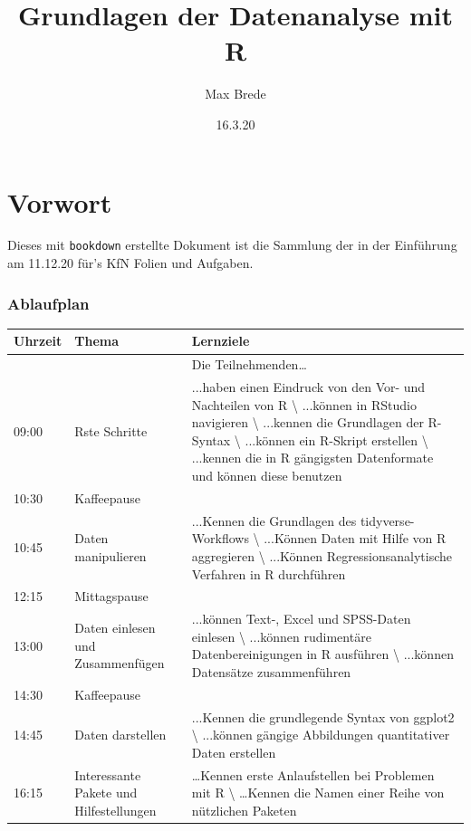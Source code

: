 \documentclass[
]{book}
\title{Grundlagen der Datenanalyse mit R}
\author{Max Brede}
\date{16.3.20}
\begin{document}
\maketitle

{
\setcounter{tocdepth}{1}
\tableofcontents
}
\hypertarget{vorwort}{%
\chapter{Vorwort}\label{vorwort}}

Dieses mit \texttt{bookdown} erstellte Dokument ist die Sammlung der in der Einführung am 11.12.20 für's KfN Folien und Aufgaben.

\hypertarget{ablaufplan}{%
\subsection{Ablaufplan}\label{ablaufplan}}

\begin{tabular}{l|l|l}
\hline
Uhrzeit & Thema & Lernziele\\
\hline
 &  & Die Teilnehmenden…\\
\hline
09:00 & Rste Schritte & ...haben einen Eindruck von den Vor- und Nachteilen von R \textbackslash{}
 ...können in RStudio navigieren \textbackslash{}
 ...kennen die Grundlagen der R-Syntax \textbackslash{}
 ...können ein R-Skript erstellen \textbackslash{}
 ...kennen die in R gängigsten Datenformate und können diese benutzen\\
\hline
10:30 & Kaffeepause & \\
\hline
10:45 & Daten manipulieren & ...Kennen die Grundlagen des tidyverse-Workflows \textbackslash{}
 ...Können Daten mit Hilfe von R aggregieren \textbackslash{}
 ...Können Regressionsanalytische Verfahren in R durchführen\\
\hline
12:15 & Mittagspause & \\
\hline
13:00 & Daten einlesen und Zusammenfügen & ...können Text-, Excel und SPSS-Daten einlesen \textbackslash{}
 ...können rudimentäre Datenbereinigungen in R ausführen \textbackslash{}
 ...können Datensätze zusammenführen\\
\hline
14:30 & Kaffeepause & \\
\hline
14:45 & Daten darstellen & ...Kennen die grundlegende Syntax von ggplot2 \textbackslash{}
 ...können gängige Abbildungen quantitativer Daten erstellen\\
\hline
16:15 & Interessante Pakete und Hilfestellungen & …Kennen erste Anlaufstellen bei Problemen mit R \textbackslash{}
 …Kennen die Namen einer Reihe von nützlichen Paketen\\
\hline
\end{tabular}
\end{document}
